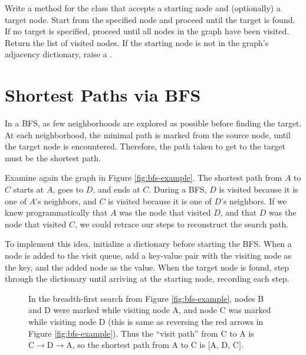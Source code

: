 \begin{problem}
Write a  method for the  class that accepts a starting node and (optionally) a target node.
Start from the specified node and proceed until the target is found.
If no target is specified, proceed until all nodes in the graph have been visited.
Return the list of visited nodes.
If the starting node is not in the graph's adjacency dictionary, raise a .
\end{problem}

\section*{Shortest Paths via BFS} %

In a BFS, as few neighborhoods are explored as possible before finding the target.
At each neighborhood, the minimal path is marked from the source node, until the target node is encountered.
Therefore, the path taken to get to the target must be the shortest path.

Examine again the graph in Figure \ref{fig:bfs-example}.
The shortest path from $A$ to $C$ starts at $A$, goes to $D$, and ends at $C$.
During a BFS, $D$ is visited because it is one of $A$'s neighbors, and $C$ is visited because it is one of $D$'s neighbors.
If we knew programmatically that $A$ was the node that visited $D$, and that $D$ was the node that visited $C$, we could retrace our steps to reconstruct the search path.

To implement this idea, initialize a dictionary before starting the BFS.
When a node is added to the visit queue, add a key-value pair with the visiting node as the key, and the added node as the value.
When the target node is found, step through the dictionary until arriving at the starting node, recording each step.

\begin{figure}[H] %
\centering
{}
\caption{In the breadth-first search from Figure \ref{fig:bfs-example}, nodes B and D were marked while visiting node A, and node C was marked while visiting node D (this is same as reversing the red arrows in Figure \ref{fig:bfs-example}).
Thus the ``visit path'' from C to A is $\text{C}\rightarrow\text{D}\rightarrow\text{A}$, so the shortest path from A to C is $[$A, D, C$]$.}
\label{fig:bfs-shortest-path}
\end{figure}

